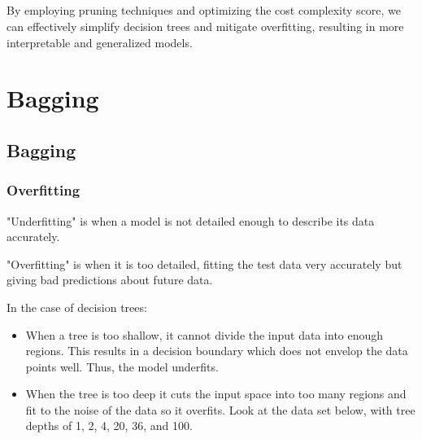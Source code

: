 \documentclass[10pt,a4paper]{report}
\begin{document}
\paragraph{}By employing pruning techniques and optimizing the cost complexity score, we can effectively simplify decision trees and mitigate overfitting, resulting in more interpretable and generalized models.\pagebreak
\chapter{Bagging}
\section{Bagging}\subsection{Overfitting}
\begin{description}
\item "Underfitting" is when a model is not detailed enough to describe its data accurately. 
\item "Overfitting" is when it is too detailed, fitting the test data very accurately but giving bad predictions about future data. 
\end{description}
In the case of decision trees:
\begin{itemize}
\item When a tree is too shallow, it cannot divide the input data into enough regions. This results in a decision boundary which does not envelop the data points well. Thus, the model underfits.
\item When the tree is too deep it cuts the input space into too many regions and fit to the noise of the data so it overfits. Look at the data set below, with tree depths of 1, 2, 4, 20, 36, and 100.
\end{itemize}
\\
\end{document}
